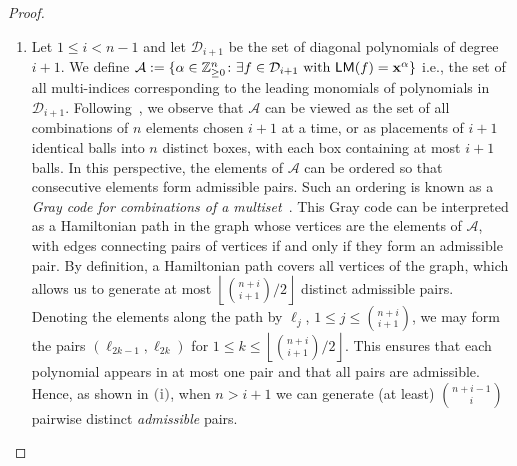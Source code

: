 \begin{proof}
\begin{enumerate}[\itshape i)]
    \item Let $1 \le i < n-1$ and let $\mathcal{D}_{i+1}$ be the set of diagonal polynomials of degree $i+1$.
    We define $\mathcal{A} := \{ \alpha \in \mathbb{Z}_{\ge 0}^n \colon \exists f \in \mathcal{D}_{i+1} \text{ with } \mathsf{LM}(f) = \mathbf{x}^\alpha \}$ i.e., the set of all multi-indices corresponding to the leading monomials of polynomials in $\mathcal{D}_{i+1}$.
    Following~\cite{DBLP:journals/ejc/RuskeyS96}, we observe that $\mathcal{A}$ can be viewed as the set of all combinations of $n$ elements chosen $i+1$ at a time, or as placements of $i+1$ identical balls into $n$ distinct boxes, with each box containing at most $i+1$ balls. In this perspective, the elements of $\mathcal{A}$ can be ordered so that consecutive elements form admissible pairs. Such an ordering is known as a \emph{Gray code for combinations of a multiset}~\cite{DBLP:journals/ejc/RuskeyS96}.  
    This Gray code can be interpreted as a Hamiltonian path in the graph whose vertices are the elements of $\mathcal{A}$, with edges connecting pairs of vertices if and only if they form an admissible pair. By definition, a Hamiltonian path covers all vertices of the graph, which allows us to generate at most $\left\lfloor {\binom{n+i}{i+1}}/{2} \right\rfloor$ distinct admissible pairs. Denoting the elements along the path by $\ell_j$, $1 \le j \le \binom{n+i}{i+1}$, we may form the pairs $(\ell_{2k-1}, \ell_{2k})$ for $1 \le k \le \left\lfloor {\binom{n+i}{i+1}}/{2} \right\rfloor$.
    This ensures that each polynomial appears in at most one pair and that all pairs are admissible.
    Hence, as shown in \textcolor{gray}{\textbf{\textsf{(i)}}}, when $n>i+1$ we can generate (at least) $\binom{n+i-1}{i}$ pairwise distinct \emph{admissible} pairs.
\end{enumerate}
\end{proof} 

